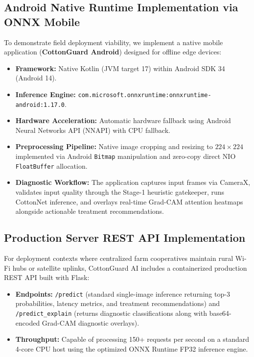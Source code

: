 \documentclass[journal,10pt,twocolumn]{IEEEtran}
\begin{document}
\subsection{Android Native Runtime Implementation via ONNX Mobile}
To demonstrate field deployment viability, we implement a native mobile application (\textbf{CottonGuard Android}) designed for offline edge devices:
\begin{itemize}[leftmargin=*]
    \item \textbf{Framework:} Native Kotlin (JVM target 17) within Android SDK 34 (Android 14).
    \item \textbf{Inference Engine:} \texttt{com.microsoft.onnxruntime:onnxruntime-android:1.17.0}.
    \item \textbf{Hardware Acceleration:} Automatic hardware fallback using Android Neural Networks API (NNAPI) with CPU fallback.
    \item \textbf{Preprocessing Pipeline:} Native image cropping and resizing to $224 \times 224$ implemented via Android \texttt{Bitmap} manipulation and zero-copy direct NIO \texttt{FloatBuffer} allocation.
    \item \textbf{Diagnostic Workflow:} The application captures input frames via CameraX, validates input quality through the Stage-1 heuristic gatekeeper, runs CottonNet inference, and overlays real-time Grad-CAM attention heatmaps alongside actionable treatment recommendations.
\end{itemize}

\subsection{Production Server REST API Implementation}
For deployment contexts where centralized farm cooperatives maintain rural Wi-Fi hubs or satellite uplinks, CottonGuard AI includes a containerized production REST API built with Flask:
\begin{itemize}[leftmargin=*]
    \item \textbf{Endpoints:} \texttt{/predict} (standard single-image inference returning top-3 probabilities, latency metrics, and treatment recommendations) and \texttt{/predict\_explain} (returns diagnostic classifications along with base64-encoded Grad-CAM diagnostic overlays).
    \item \textbf{Throughput:} Capable of processing 150+ requests per second on a standard 4-core CPU host using the optimized ONNX Runtime FP32 inference engine.
\end{itemize}
\end{document}
